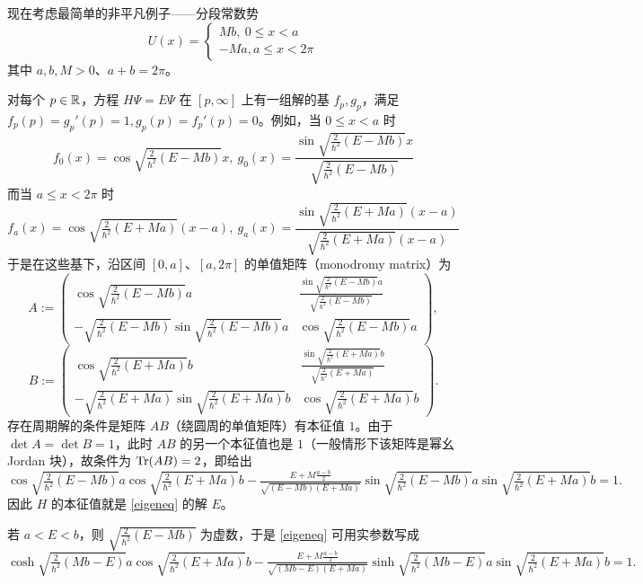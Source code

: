 现在考虑最简单的非平凡例子——分段常数势
\begin{equation}\label{pcon}
U(x)=\begin{cases} Mb,\ 0\le x<a\\ -Ma,a\le x<2\pi\end{cases}
\end{equation}
其中 $a,b,M>0$、$a+b=2\pi$。

对每个 $p\in \Bbb R$，方程 $H\Psi=E\Psi$ 在 $[p,\infty]$ 上有一组解的基 $f_p,g_p$，满足 $f_p(p)=g_p'(p)=1,g_p(p)=f_p'(p)=0$。例如，当 $0\le x<a$ 时
$$
f_0(x)=\cos \sqrt{\tfrac{2}{\hbar^2}(E-Mb)}x,\ g_0(x)=\frac{\sin \sqrt{\frac{2}{\hbar^2}(E-Mb)}x}{\sqrt{\frac{2}{\hbar^2}(E-Mb)}}
$$
而当 $a\le x<2\pi$ 时
$$
f_a(x)=\cos \sqrt{\tfrac{2}{\hbar^2}(E+Ma)}(x-a),\ g_a(x)=\frac{\sin \sqrt{\frac{2}{\hbar^2}(E+Ma)}(x-a)}{\sqrt{\frac{2}{\hbar^2}(E+Ma)}(x-a)}
$$ 
于是在这些基下，沿区间 $[0,a]$、$[a,2\pi]$ 的单值矩阵（monodromy matrix）为
$$
A:=\begin{pmatrix} \cos \sqrt{\frac{2}{\hbar^2}(E-Mb)} a & \frac{\sin \sqrt{\frac{2}{\hbar^2}(E-Mb)}a}{\sqrt{\frac{2}{\hbar^2}(E-Mb)}} \\
-\sqrt{\frac{2}{\hbar^2}(E-Mb)}\sin \sqrt{\frac{2}{\hbar^2}(E-Mb)} a& \cos \sqrt{\frac{2}{\hbar^2}(E-Mb)} a\end{pmatrix},
$$
$$
B:=\begin{pmatrix} \cos \sqrt{\frac{2}{\hbar^2}(E+Ma)} b & \frac{\sin \sqrt{\frac{2}{\hbar^2}(E+Ma)}b}{\sqrt{\frac{2}{\hbar^2}(E+Ma)}} \\
-\sqrt{\frac{2}{\hbar^2}(E+Ma)}\sin \sqrt{\frac{2}{\hbar^2}(E+Ma)} b& \cos \sqrt{\frac{2}{\hbar^2}(E+Ma)} b\end{pmatrix}.
$$
存在周期解的条件是矩阵 $AB$（绕圆周的单值矩阵）有本征值 $1$。由于 $\det A=\det B=1$，此时 $AB$ 的另一个本征值也是 $1$（一般情形下该矩阵是幂幺 Jordan 块），故条件为 ${\rm Tr}(AB)=2$，即给出
\scriptsize
\begin{equation}\label{eigeneq}
\cos \sqrt{\tfrac{2}{\hbar^2}(E-Mb)} a \cos \sqrt{\tfrac{2}{\hbar^2}(E+Ma)} b-\tfrac{E+M\frac{a-b}{2}}{\sqrt{(E-Mb)(E+Ma)}}\sin \sqrt{\tfrac{2}{\hbar^2}(E-Mb)} a \sin \sqrt{\tfrac{2}{\hbar^2}(E+Ma)} b=1.
\end{equation}
\normalsize
因此 $H$ 的本征值就是 \eqref{eigeneq} 的解 $E$。

若 $a<E<b$，则 $\sqrt{\frac{2}{\hbar^2}(E-Mb)}$ 为虚数，于是 \eqref{eigeneq} 可用实参数写成
\scriptsize
\begin{equation}\label{eigeneq1}
\cosh \sqrt{\tfrac{2}{\hbar^2}(Mb-E)} a \cos \sqrt{\tfrac{2}{\hbar^2}(E+Ma)} b-\tfrac{E+M\frac{a-b}{2}}{\sqrt{(Mb-E)(E+Ma)}}\sinh \sqrt{\tfrac{2}{\hbar^2}(Mb-E)} a \sin \sqrt{\tfrac{2}{\hbar^2}(E+Ma)} b=1.
\end{equation}
\normalsize

